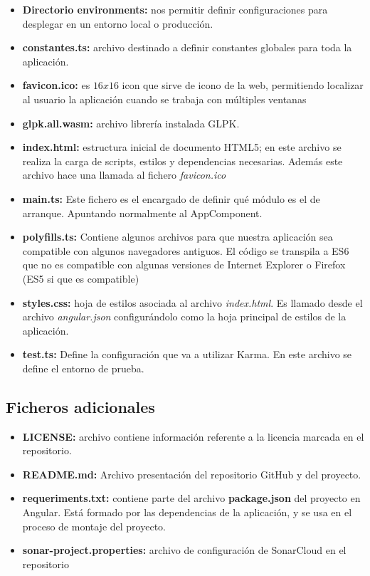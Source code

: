 \begin{itemize}
    
    \item \textbf{Directorio environments:} nos permitir definir configuraciones para desplegar en un entorno local o producción.
    \item \textbf{constantes.ts:} archivo destinado a definir constantes globales para toda la aplicación.
    \item \textbf{favicon.ico:} es $16x16$ icon que sirve de icono de la web, permitiendo localizar al usuario la aplicación cuando se trabaja con múltiples ventanas
    \item \textbf{glpk.all.wasm:} archivo librería instalada GLPK.
    \item \textbf{index.html:} estructura inicial de documento HTML5; en este archivo se realiza la carga de scripts, estilos y dependencias necesarias. Además este archivo hace una llamada al fichero \textit{favicon.ico}
    \item \textbf{main.ts:} Este fichero es el encargado de definir qué módulo es el de arranque. Apuntando normalmente al AppComponent.
    \item \textbf{polyfills.ts:} Contiene algunos archivos para que nuestra aplicación sea compatible con algunos navegadores antiguos. El código se transpila a ES6 que no es compatible con algunas versiones de Internet Explorer o Firefox (ES5 si que es compatible) 
    \item \textbf{styles.css:} hoja de estilos asociada al archivo \textit{index.html}. Es llamado desde el archivo \textit{angular.json} configurándolo como la hoja principal de estilos de la aplicación.
    \item \textbf{test.ts:} Define la configuración que va a utilizar Karma. En este archivo se define el entorno de prueba.
\end{itemize}

\subsection{Ficheros adicionales}

\begin{itemize}
    \item \textbf{LICENSE:} archivo contiene información referente a la licencia marcada en el repositorio.
    \item \textbf{README.md:} Archivo presentación del repositorio GitHub y del proyecto.
    \item \textbf{requeriments.txt:} contiene parte del archivo \textbf{package.json} del proyecto en Angular. Está formado por las dependencias de la aplicación, y se usa en el proceso de montaje del proyecto. 
    \item \textbf{sonar-project.properties:} archivo de configuración de SonarCloud en el repositorio
\end{itemize}

